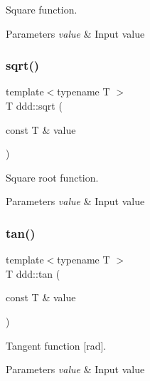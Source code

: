 Square function. 


\begin{DoxyParams}{Parameters}
{\em value} & Input value \\
\hline
\end{DoxyParams}
\mbox{\label{namespaceddd_a99ebeda8499ba29e0302f0f3c6e43549}} 
\subsubsection{\texorpdfstring{sqrt()}{sqrt()}}
{\footnotesize\ttfamily template$<$typename T $>$ \\
T ddd\+::sqrt (\begin{DoxyParamCaption}\item[{const T \&}]{value }\end{DoxyParamCaption})\hspace{0.3cm}{\ttfamily [inline]}}



Square root function. 


\begin{DoxyParams}{Parameters}
{\em value} & Input value \\
\hline
\end{DoxyParams}
\mbox{\label{namespaceddd_aeb0ca0d620545cbb5ef955eed88d1c0d}} 
\subsubsection{\texorpdfstring{tan()}{tan()}}
{\footnotesize\ttfamily template$<$typename T $>$ \\
T ddd\+::tan (\begin{DoxyParamCaption}\item[{const T \&}]{value }\end{DoxyParamCaption})\hspace{0.3cm}{\ttfamily [inline]}}



Tangent function \mbox{[}rad\mbox{]}. 


\begin{DoxyParams}{Parameters}
{\em value} & Input value \\
\hline
\end{DoxyParams}

